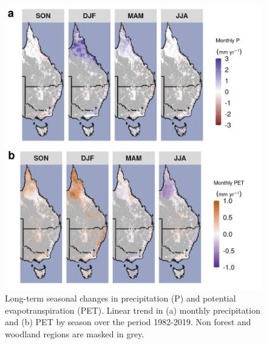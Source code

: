 \documentclass[gc, manuscript]{copernicus}
\begin{document}
\clearpage
\begin{figure}
\includegraphics[width=14cm]{../../figures/appendix-A/SM_Fig2_Map_EastOz_lt_TheilSen_seasonal_P_PET} \caption{Long-term seasonal changes in precipitation (P) and potential evapotranspiration (PET). Linear trend in (a) monthly precipitation and (b) PET by season over the period 1982-2019. Non forest and woodland regions are masked in grey.}\label{fig:FigA2}
\end{figure}
\clearpage
\end{document}
